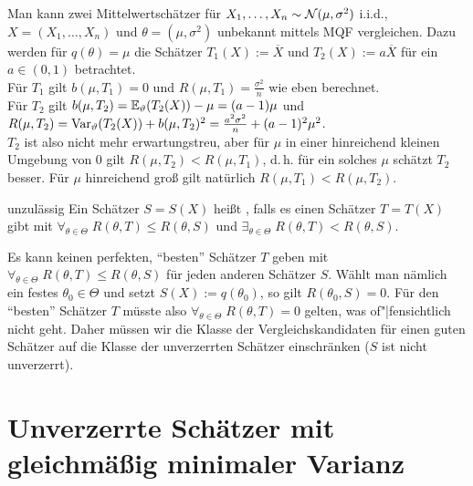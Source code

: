 \begin{Bsp}
    Man kann zwei Mittelwertschätzer für $X_1, \dotsc, X_n \sim \mathcal{N}(\mu, \sigma^2)$ i.i.d.,
    $X = (X_1, \dotsc, X_n)$ und $\theta = (\mu, \sigma^2)$ unbekannt mittels MQF vergleichen.
    Dazu werden für $q(\theta) = \mu$
    die Schätzer $T_1(X) := \overline{X}$ und $T_2(X) := a \overline{X}$ für ein
    $a \in (0, 1)$ betrachtet.\\
    Für $T_1$ gilt $b(\mu, T_1) = 0$ und $R(\mu, T_1) = \frac{\sigma^2}{n}$ wie eben berechnet.\\
    Für $T_2$ gilt $b(\mu, T_2) = \mathbb{E}_\vartheta(T_2(X)) - \mu = (a - 1)\mu$ und\\
    $R(\mu, T_2) = \mathrm{Var}_\vartheta(T_2(X)) + b(\mu, T_2)^2 = \frac{a^2 \sigma^2}{n} + (a-1)^2 \mu^2$.\\
    $T_2$ ist also nicht mehr erwartungstreu, aber für $\mu$ in einer hinreichend kleinen Umgebung
    von $0$ gilt $R(\mu, T_2) < R(\mu, T_1)$, d.\,h. für ein solches $\mu$ schätzt $T_2$ besser.
    Für $\mu$ hinreichend groß gilt natürlich $R(\mu, T_1) < R(\mu, T_2)$.
\end{Bsp}

\linie

\begin{Def}{unzulässig}
    Ein Schätzer $S = S(X)$ heißt , falls es einen Schätzer $T = T(X)$ gibt
    mit $\forall_{\theta \in \Theta}\; R(\theta, T) \le R(\theta, S)$ und
    $\exists_{\theta \in \Theta}\; R(\theta, T) < R(\theta, S)$.
\end{Def}

\begin{Bem}
    Es kann keinen perfekten, "`besten"' Schätzer $T$ geben mit
    $\forall_{\theta \in \Theta}\; R(\theta, T) \le R(\theta, S)$ für jeden anderen Schätzer $S$.
    Wählt man nämlich ein festes $\theta_0 \in \Theta$ und setzt $S(X) := q(\theta_0)$, so gilt
    $R(\theta_0, S) = 0$.
    Für den "`besten"' Schätzer $T$ müsste also $\forall_{\theta \in \Theta}\; R(\theta, T) = 0$
    gelten, was of"|fensichtlich nicht geht.
    Daher müssen wir die Klasse der Vergleichskandidaten für einen guten Schätzer auf die Klasse
    der unverzerrten Schätzer einschränken ($S$ ist nicht unverzerrt).
\end{Bem}

\pagebreak

\section{%
    Unverzerrte Schätzer mit gleichmäßig minimaler Varianz%
}

